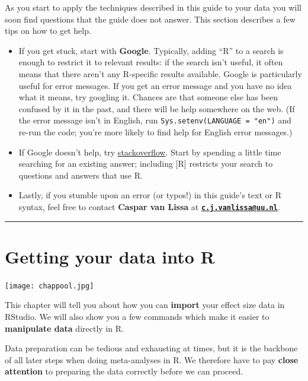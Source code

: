 \documentclass[]{book}
\providecommand{\tightlist}{%
  \setlength{\itemsep}{0pt}\setlength{\parskip}{0pt}}
\begin{document}
As you start to apply the techniques described in this guide to your data you will soon find questions that the guide does not answer. This section describes a few tips on how to get help.

\begin{itemize}
\tightlist
\item
  If you get stuck, start with \textbf{Google}. Typically, adding ``R'' to a search is enough to restrict it to relevant results: if the search isn't useful, it often means that there aren't any R-specific results available. Google is particularly useful for error messages. If you get an error message and you have no idea what it means, try googling it. Chances are that someone else has been confused by it in the past, and there will
  be help somewhere on the web. (If the error message isn't in English,
  run \texttt{Sys.setenv(LANGUAGE\ =\ "en")} and re-run the code; you're
  more likely to find help for English error messages.)
\item
  If Google doesn't help, try \href{https://stackoverflow.com}{stackoverflow}. Start by spending a little time searching for an existing answer; including {[}R{]} restricts your search to questions and answers that use R.
\item
  Lastly, if you stumble upon an error (or typos!) in this guide's text or R syntax, feel free to contact \textbf{Caspar van Lissa} at \textbf{\href{mailto:c.j.vanlissa@uu.nl}{\nolinkurl{c.j.vanlissa@uu.nl}}}.
\end{itemize}

\begin{center}\rule{0.5\linewidth}{\linethickness}\end{center}

\hypertarget{getting-your-data-into-r}{%
\chapter{Getting your data into R}\label{getting-your-data-into-r}}

\texttt{[image: chappool.jpg]}

\begin{rmdinfo}
This chapter will tell you about how you can \textbf{import} your effect
size data in RStudio. We will also show you a few commands which make it
easier to \textbf{manipulate data} directly in R.

Data preparation can be tedious and exhausting at times, but it is the
backbone of all later steps when doing meta-analyses in R. We therefore
have to pay \textbf{close attention} to preparing the data correctly
before we can proceed.
\end{rmdinfo}
\end{document}
